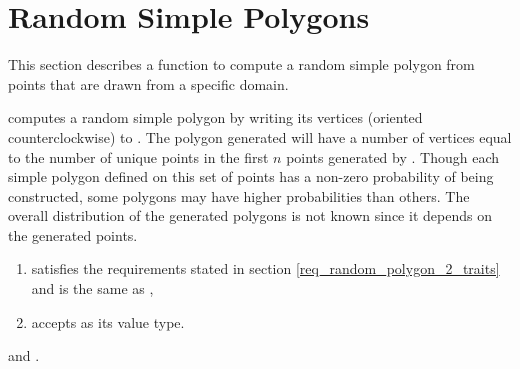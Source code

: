 
\newpage

\ccParDims

\section{Random Simple Polygons}
\label{section_RandomSimplePolygons}

This section describes a function to compute a random simple polygon
from points that are drawn from a specific domain.



{
computes a random simple polygon by writing its vertices (oriented
counterclockwise) to . The polygon generated will have a number
of vertices equal to the number of unique points in the first $n$ points
generated by . Though each simple polygon defined on this set of 
points has a non-zero probability of being constructed, some polygons may 
have higher probabilities than others.  The overall distribution of the
generated polygons is not known since it depends on the generated points.
}

\begin{enumerate}
\item {} satisfies the requirements stated in
      section \ref{req_random_polygon_2_traits} and  
      is the same as ,
\item {} accepts  as its
      value type.
\end{enumerate}


\ccSeeAlso {} and
.


